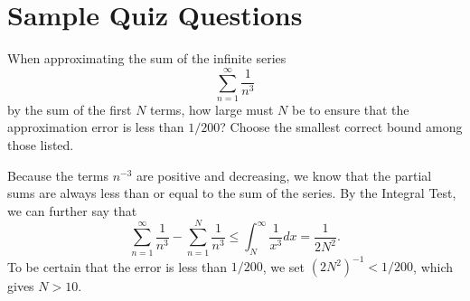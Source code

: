 \documentclass{ximera}
\begin{document}
\section*{Sample Quiz Questions}

\begin{question}%

When approximating the sum of the infinite series
\[ \sum_{n=1}^\infty \frac{1}{n^3} \]
by the sum of the first \(N\) terms, how large must \(N\) be to ensure that the approximation error is less than \(1/200\)? Choose the smallest correct bound among those listed.
\begin{multiplechoice}
\end{multiplechoice}
\begin{feedback}
Because the terms \(n^{-3}\) are positive and decreasing, we know that the partial sums are always less than or equal to the sum of the series. By the Integral Test, we can further say that
\[ \sum_{n=1}^\infty \frac{1}{n^3} - \sum_{n=1}^N \frac{1}{n^3} \leq \int_N^\infty \frac{1}{x^3} dx  = \frac{1}{2N^2}.\]
To be certain that the error is less than \(1/200\), we set \((2 N^2)^{-1} < 1/200\), which gives \(N > 10\).
\end{feedback}

\end{question}
\end{document}
